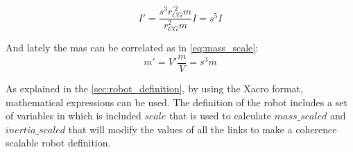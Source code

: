 \begin{equation}
\label{eq:inertia_scale}
  I' = \frac{s^{3} r_{CG}^{'2} m}{r_{CG}^{2} m} I = s^{5} I
\end{equation}

And lately the mas can be correlated as in \ref{eq:mass_scale}:
\begin{equation}
\label{eq:mass_scale}
  m' = V' \frac{m}{V} = s^{3}m
\end{equation}

As explained in the \ref{sec:robot_definition}, by using the Xacro format, mathematical expressions can be used.
The definition of the robot includes a set of variables in which is included $scale$ that is used to calculate $mass\_scaled$ and $inertia\_scaled$ that will modify the values of all the links to make a coherence scalable robot definition.

